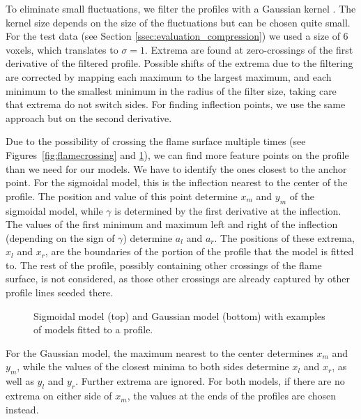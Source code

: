 To eliminate small fluctuations, we filter the profiles with a Gaussian kernel
\cite{Jaehne2005}. The kernel size depends on the size of the fluctuations
but can be chosen quite small. For the test data (see Section
\ref{ssec:evaluation_compression}) we used a size of $6$ voxels, which translates
to $\sigma = 1$.
%
Extrema are found at zero-crossings of the first derivative of the filtered
profile. Possible shifts of the extrema due to the filtering are corrected by
mapping each maximum to the largest maximum, and each minimum to the smallest
minimum in the radius of the filter size, taking care that extrema do not switch
sides. For finding inflection points, we use the same approach but on the second
derivative.

Due to the possibility of crossing the flame surface multiple times (see
Figures~\ref{fig:flamecrossing} and \ref{fig:models}), we can find more feature
points on the profile than we need for our models. We have to identify the ones
closest to the anchor point.
%
For the sigmoidal model, this is the inflection nearest to the center of the
profile. The position and value of this point determine $x_m$ and $y_m$ of the
sigmoidal model, while $\gamma$ is determined by the first derivative at the
inflection. The values of the first minimum and maximum left and right of the
inflection (depending on the sign of $\gamma$) determine $a_l$ and $a_r$. The
positions of these extrema, $x_l$ and $x_r$, are the boundaries of the portion
of the profile that the model is fitted to. The rest of the profile, possibly
containing other crossings of the flame surface, is not considered, as those
other crossings are already captured by other profile lines seeded there.
%
\begin{figure}[t!]
	\centering
	\setlength{}
	\setlength\figureheight{2.2cm}
	
	\caption{
	Sigmoidal model (top) and Gaussian model (bottom) with examples of models
	fitted to a profile.}
	\label{fig:models}
\end{figure}
%
% 		
%
For the Gaussian model, the maximum nearest to the center determines $x_m$
and $y_m$, while the values of the closest minima to both sides determine $x_l$
and $x_r$, as well as $y_l$ and $y_r$. Further extrema are ignored. For both
models, if there are no extrema on either side of $x_m$, the values at the ends
of the profiles are chosen instead.

